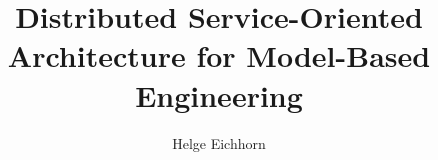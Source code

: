 \documentclass[draft=true, twoside]{scrbook}
\begin{document}
\frontmatter
\title{Distributed Service-Oriented Architecture for Model-Based Engineering}
\author{Helge Eichhorn}
\maketitle




\tableofcontents
\listoffigures
\listoftables


\mainmatter








\printbibliography[heading=bibintoc]
\appendix
\end{document}
